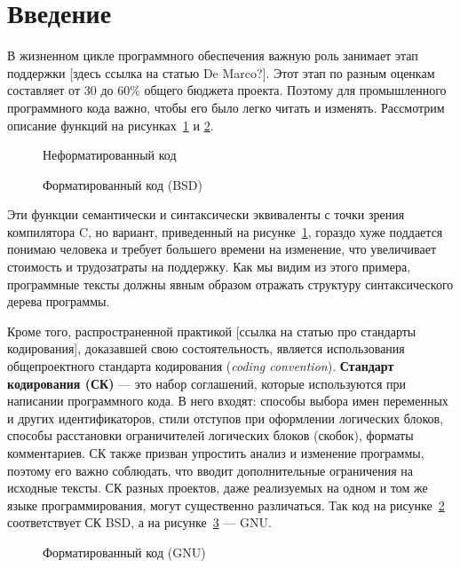 \section*{Введение}

В жизненном цикле программного обеспечения важную роль занимает этап
поддержки [здесь ссылка на статью De Marco?]. Этот этап по разным оценкам
составляет от 30 до 60\% общего бюджета проекта. Поэтому для
промышленного программного кода важно, чтобы его было легко читать и изменять.
Рассмотрим описание функций
на рисунках~\ref{fig:wikiExUnfor} и \ref{fig:wikiExBSD}.

\begin{figure}[h!]
	\centering
	
	\caption{Неформатированный код}
	\label{fig:wikiExUnfor}
\end{figure}

\begin{figure}[h!]
	\centering
	
  \caption{Форматированный код (BSD)}
	\label{fig:wikiExBSD}
\end{figure}

Эти функции семантически и синтаксически эквиваленты с точки зрения
компилятора C, но вариант, приведенный на
рисунке~\ref{fig:wikiExUnfor}, гораздо хуже
поддается понимаю человека и требует большего времени на изменение,
что увеличивает стоимость и трудозатраты на поддержку. Как мы видим из этого
примера, программные тексты должны явным образом отражать
структуру синтаксического дерева программы.

Кроме того, распространенной практикой [ссылка на статью про стандарты
кодирования], доказавшей свою состоятельность, является использования
общепроектного стандарта кодирования (\textit{coding convention}).
\textbf{Стандарт кодирования (СК)} ---
это набор соглашений, которые используются
при написании программного кода. В него входят: способы выбора имен переменных
и других идентификаторов, стили отступов при оформлении логических блоков,
способы расстановки ограничителей логических блоков (скобок),
форматы комментариев. СК также призван упростить анализ и изменение
программы, поэтому его важно соблюдать, что вводит
дополнительные ограничения на исходные тексты. СК разных проектов, даже
реализуемых на одном и том же языке программирования, могут существенно
различаться.
Так код на рисунке~\ref{fig:wikiExBSD} соответствует СК BSD,
а на рисунке~\ref{fig:wikiExGNU} --- GNU.

\begin{figure}[h!]
	\centering
	
  \caption{Форматированный код (GNU)}
	\label{fig:wikiExGNU}
\end{figure}


